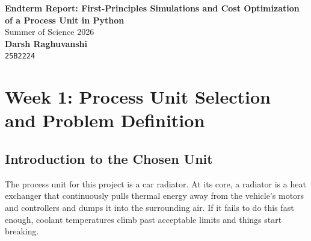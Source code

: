 \documentclass[12pt, a4paper]{article}
\begin{document}
\begin{titlepage}
    \vspace*{\fill} 
    
    \begin{center}
        {\LARGE \textbf{Endterm Report: First-Principles Simulations and Cost Optimization of a Process Unit in Python}}\\[1.5cm]
        
        {\Large Summer of Science 2026}\\[2cm]
        
        {\large \textbf{Darsh Raghuvanshi}} \\
        {\large \texttt{25B2224}}
    \end{center}
    
    \vspace*{\fill}
\end{titlepage}

\setcounter{page}{2}

\newpage

\begin{abstract}
This report involves the progress throughout my Summer of Science (SoS) project. It includes first studying about process units and choosing one to pursue through the course of this project. It also involved learning python and important libraries such as NumPy and matplotlib which would later be essential in building the digitial twin of the chosen process unit which was a car radiator. I also learned how to solve ODE's using numerical methods such as Euler method and Runge-Kutta (RK4) method. Later on it allows assessing Key Performance Indicators (KPI) and implementing a cost function (CAPEX and OPEX) and then optimizing to minimize cost.
\end{abstract}
\newpage

\tableofcontents
\newpage

\section{Week 1: Process Unit Selection and Problem Definition}

\subsection{Introduction to the Chosen Unit}
The process unit for this project is a car radiator. At its core, a radiator is a heat exchanger that continuously pulls thermal energy away from the vehicle's motors and controllers and dumps it into the surrounding air. If it fails to do this fast enough, coolant temperatures climb past acceptable limits and things start breaking.
\end{document}
